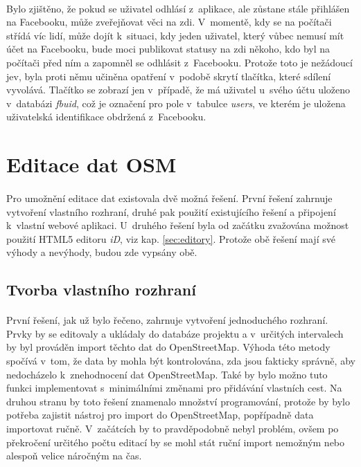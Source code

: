 \documentclass[11pt,a4paper,titlepage,oneside]{book}
\begin{document}
				\paragraph{} Bylo zjištěno, že pokud se uživatel odhlásí z~aplikace, ale zůstane stále přihlášen na Facebooku, může zveřejňovat věci na zdi. V~momentě, kdy se na počítači střídá víc lidí, může dojít k~situaci, kdy jeden uživatel, který vůbec nemusí mít účet na Facebooku, bude moci publikovat statusy na zdi někoho, kdo byl na počítači před ním a zapomněl se odhlásit z~Facebooku. Protože toto je nežádoucí jev, byla proti němu učiněna opatření v~podobě skrytí tlačítka, které sdílení vyvolává. Tlačítko se zobrazí jen v~případě, že má uživatel u~svého účtu uloženo v~databázi \textit{fbuid}, což je označení pro pole v~tabulce \textit{users}, ve kterém je uložena uživatelská identifikace obdržená z~Facebooku.
		

		\section{Editace dat OSM}


				\paragraph{} Pro umožnění editace dat existovala dvě možná řešení. První řešení zahrnuje vytvoření vlastního rozhraní, druhé pak použití existujícího řešení a připojení k~vlastní webové aplikaci. U~druhého řešení byla od začátku zvažována možnost použití HTML5 editoru \textit{iD}, viz kap. \ref{sec:editory}. Protože obě řešení mají své výhody a nevýhody, budou zde vypsány obě.
			\subsection{Tvorba vlastního rozhraní}
				\paragraph{} První řešení, jak už bylo řečeno, zahrnuje vytvoření jednoduchého rozhraní. Prvky by se editovaly a  ukládaly do databáze projektu a v~určitých intervalech by byl prováděn import těchto dat do OpenStreetMap. Výhoda této metody spočívá v~tom, že data by mohla být kontrolována, zda jsou fakticky správně, aby nedocházelo k~znehodnocení dat OpenStreetMap. Také by bylo možno tuto funkci implementovat s~minimálními změnami pro přidávání vlastních cest. Na druhou stranu by toto řešení znamenalo množství programování, protože by bylo potřeba zajistit nástroj pro import do OpenStreetMap, popřípadně data importovat ručně. V~začátcích by to pravdě\-podobně nebyl problém, ovšem po překročení určitého počtu editací by se mohl stát ruční import nemožným nebo alespoň velice náročným na čas.
\end{document}
